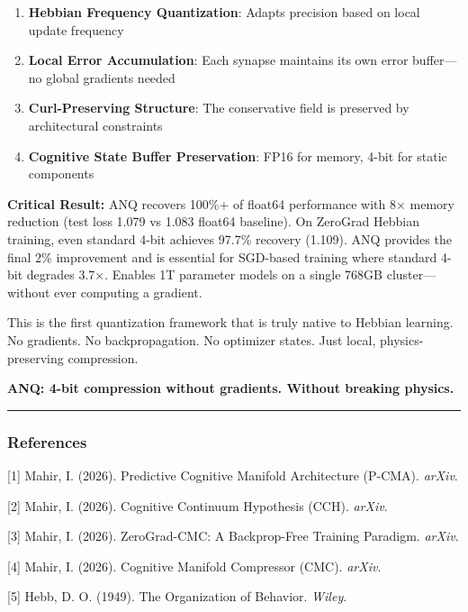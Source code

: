 \documentclass[
  11pt,
  a4paper,
]{article}
\providecommand{\tightlist}{%
  \setlength{\itemsep}{0pt}\setlength{\parskip}{0pt}}
\begin{document}
\begin{enumerate}
\def\labelenumi{\arabic{enumi}.}
\tightlist
\item
  \textbf{Hebbian Frequency Quantization}: Adapts precision based on
  local update frequency
\item
  \textbf{Local Error Accumulation}: Each synapse maintains its own
  error buffer---no global gradients needed
\item
  \textbf{Curl-Preserving Structure}: The conservative field is
  preserved by architectural constraints
\item
  \textbf{Cognitive State Buffer Preservation}: FP16 for memory, 4-bit
  for static components
\end{enumerate}

\textbf{Critical Result:} ANQ recovers 100\%+ of float64 performance
with 8× memory reduction (test loss 1.079 vs 1.083 float64 baseline). On
ZeroGrad Hebbian training, even standard 4-bit achieves 97.7\% recovery
(1.109). ANQ provides the final 2\% improvement and is essential for
SGD-based training where standard 4-bit degrades 3.7×. Enables 1T
parameter models on a single 768GB cluster---without ever computing a
gradient.

This is the first quantization framework that is truly native to Hebbian
learning. No gradients. No backpropagation. No optimizer states. Just
local, physics-preserving compression.

\textbf{ANQ: 4-bit compression without gradients. Without breaking
physics.}

\begin{center}\rule{0.5\linewidth}{0.5pt}\end{center}

\subsubsection{References}\label{references}

{[}1{]} Mahir, I. (2026). Predictive Cognitive Manifold Architecture
(P-CMA). \emph{arXiv}.

{[}2{]} Mahir, I. (2026). Cognitive Continuum Hypothesis (CCH).
\emph{arXiv}.

{[}3{]} Mahir, I. (2026). ZeroGrad-CMC: A Backprop-Free Training
Paradigm. \emph{arXiv}.

{[}4{]} Mahir, I. (2026). Cognitive Manifold Compressor (CMC).
\emph{arXiv}.

{[}5{]} Hebb, D. O. (1949). The Organization of Behavior. \emph{Wiley}.
\end{document}
